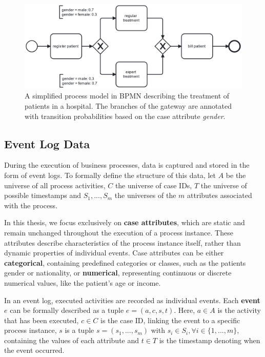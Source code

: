 \begin{figure}[h!]
    \centering
    \includegraphics[width=\textwidth]{gfx/showcase.png}
    \caption{A simplified process model in BPMN describing the treatment of patients in a hospital.
    The branches of the gateway are annotated with transition probabilities based on the case attribute \textit{gender}.}
    \label{fig:bpmn_example}
\end{figure}

\subsection{Event Log Data}
\label{sec:event_log}
During the execution of business processes, data is captured and stored in the form of event logs.
To formally define the structure of this data,
let $A$ be the universe of all process activities,
$C$ the universe of case IDs,
$T$ the universe of possible timestamps
and $S_1, ..., S_m$ the universes of the $m$ attributes associated with the process.

In this thesis, we focus exclusively on \textbf{case attributes},
which are static and remain unchanged throughout the execution of a process instance.
These attributes describe characteristics of the process instance itself,
rather than dynamic properties of individual events.
Case attributes can be either \textbf{categorical},
containing predefined categories or classes, such as the patients gender or nationality,
or \textbf{numerical}, representing continuous or discrete numerical values, like the patient's age or income. 

In an event log, executed activities are recorded as individual events.
Each \textbf{event} $e$ can be formally described as a tuple $e = (a, c, s, t)$.
Here, $a \in A$ is the activity that has been executed,
$c \in C$ is the case ID, linking the event to a specific process instance,
$s$ is a tuple $s = (s_1, ..., s_m)$ with $s_i \in S_i, \forall i \in \{1, ..., m\}$,
containing the values of each attribute
and $t \in T$ is the timestamp denoting when the event occurred.

